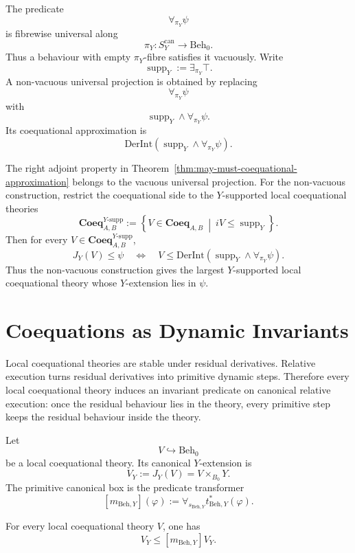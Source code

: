 \begin{remark}
\label{rem:vacuity-universal-projections}
The predicate
\[
  \forall_{\pi_Y}\psi
\]
is fibrewise universal along
\[
  \pi_Y:S^{\mathrm{can}}_Y\to\mathrm{Beh}_0.
\]
Thus a behaviour with empty \(\pi_Y\)-fibre satisfies it vacuously.  Write
\[
  \operatorname{supp}_Y:=\exists_{\pi_Y}\top.
\]
A non-vacuous universal projection is obtained by replacing
\[
  \forall_{\pi_Y}\psi
\]
with
\[
  \operatorname{supp}_Y\wedge \forall_{\pi_Y}\psi.
\]
Its coequational approximation is
\[
  \mathrm{DerInt}
  \left(
    \operatorname{supp}_Y\wedge \forall_{\pi_Y}\psi
  \right).
\]

The right adjoint property in
Theorem~\ref{thm:may-must-coequational-approximation} belongs to the
vacuous universal projection.  For the non-vacuous construction, restrict the
coequational side to the \(Y\)-supported local coequational theories
\[
  \mathbf{Coeq}^{Y\text{-supp}}_{A,B}
  :=
  \left\{
    V\in\mathbf{Coeq}_{A,B}
    \ \middle|\
    iV\leq \operatorname{supp}_Y
  \right\}.
\]
Then for every \(V\in \mathbf{Coeq}^{Y\text{-supp}}_{A,B}\),
\[
  J_Y(V)\leq\psi
  \quad\Longleftrightarrow\quad
  V\leq
  \mathrm{DerInt}
  \left(
    \operatorname{supp}_Y\wedge \forall_{\pi_Y}\psi
  \right).
\]
Thus the non-vacuous construction gives the largest \(Y\)-supported local
coequational theory whose \(Y\)-extension lies in \(\psi\).
\end{remark}

\section{Coequations as Dynamic Invariants}
\label{sec:coequations-as-dynamic-invariants}

Local coequational theories are stable under residual derivatives.  Relative
execution turns residual derivatives into primitive dynamic steps.  Therefore
every local coequational theory induces an invariant predicate on canonical
relative execution: once the residual behaviour lies in the theory, every
primitive step keeps the residual behaviour inside the theory.

Let
\[
  V\hookrightarrow\mathrm{Beh}_0
\]
be a local coequational theory.  Its canonical \(Y\)-extension is
\[
  V_Y:=J_Y(V)=V\times_{B_0}Y.
\]
The primitive canonical box is the predicate transformer
\[
  [m_{\mathrm{Beh},Y}](\varphi)
  :=
  \forall_{s_{\mathrm{Beh},Y}}
  t_{\mathrm{Beh},Y}^*(\varphi).
\]

\begin{theorem}
\label{thm:coequations-induce-primitive-invariants}
For every local coequational theory \(V\), one has
\[
  V_Y\leq [m_{\mathrm{Beh},Y}]V_Y.
\]
\end{theorem}

